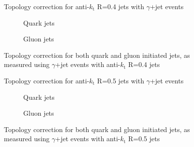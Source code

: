 \clearpage
\begin{figure}[!ht]
 \centering
 \caption[Topology correction for anti-$k_{\mathrm t}$ R=0.4 jets with $\gamma$+jet events]
 {\small Topology correction for anti-$k_{\mathrm t}$ R=0.4 jets with $\gamma$+jet events}
 \label{plot:GJetTopoCorr4App}
\end{figure}

\begin{figure}[!ht]
 \centering
 \begin{subfigure}{.5\textwidth}
  \centering
  \caption{Quark jets}
 \end{subfigure}%
 \begin{subfigure}{.5\textwidth}
  \centering
  \caption{Gluon jets}
 \end{subfigure}
 \caption[Quark/gluon jet topology correction, anti-$k_{\mathrm t}$ R=0.4, $\gamma$+jet]
 {\small Topology correction for both quark and gluon initiated jets, as measured using $\gamma$+jet events with anti-$k_{\mathrm t}$ R=0.4 jets}
 \label{plot:GJetTopoCorrFlav4App}
\end{figure}

\clearpage
\begin{figure}[!ht]
 \centering
 \caption[Topology correction for anti-$k_{\mathrm t}$ R=0.5 jets with $\gamma$+jet events]
 {\small Topology correction for anti-$k_{\mathrm t}$ R=0.5 jets with $\gamma$+jet events}
 \label{plot:GJetTopoCorr5App}
\end{figure}

\begin{figure}[!ht]
 \centering
 \begin{subfigure}{.5\textwidth}
  \centering
  \caption{Quark jets}
 \end{subfigure}%
 \begin{subfigure}{.5\textwidth}
  \centering
  \caption{Gluon jets}
 \end{subfigure}
 \caption[Quark/gluon jet topology correction, anti-$k_{\mathrm t}$ R=0.5, $\gamma$+jet]
 {\small Topology correction for both quark and gluon initiated jets, as measured using $\gamma$+jet events with anti-$k_{\mathrm t}$ R=0.5 jets}
 \label{plot:GJetTopoCorrFlav5App}
\end{figure}

